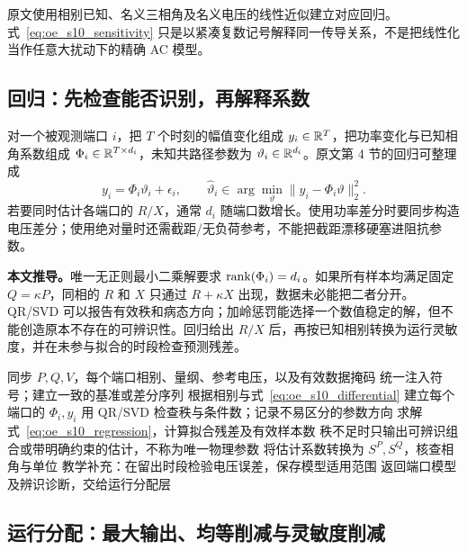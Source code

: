 原文使用相别已知、名义三相角及名义电压的线性近似建立对应回归。式~\eqref{eq:oe_s10_sensitivity} 只是以紧凑复数记号解释同一传导关系，不是把线性化当作任意大扰动下的精确 AC 模型。

\subsection{回归：先检查能否识别，再解释系数}

对一个被观测端口 $i$，把 $T$ 个时刻的幅值变化组成
$y_i\in\mathbb{R}^T$，把功率变化与已知相角系数组成
$\Phi_i\in\mathbb{R}^{T\times d_i}$，未知共路径参数为
$\vartheta_i\in\mathbb{R}^{d_i}$。原文第 4 节的回归可整理成
\begin{equation}
 y_i=\Phi_i\vartheta_i+\epsilon_i,\qquad
 \hat\vartheta_i\in\arg\min_\vartheta\|y_i-\Phi_i\vartheta\|_2^2.
 \label{eq:oe_s10_regression}
\end{equation}
若要同时估计各端口的 $R/X$，通常 $d_i$ 随端口数增长。使用功率差分时要同步构造电压差分；使用绝对量时还需截距/无负荷参考，不能把截距漂移硬塞进阻抗参数。

\textbf{本文推导。}唯一无正则最小二乘解要求
$\operatorname{rank}(\Phi_i)=d_i$。如果所有样本均满足固定 $Q=\kappa P$，同相的 $R$ 和 $X$ 只通过 $R+\kappa X$ 出现，数据未必能把二者分开。QR/SVD 可以报告有效秩和病态方向；加岭惩罚能选择一个数值稳定的解，但不能创造原本不存在的可辨识性。回归给出 $R/X$ 后，再按已知相别转换为运行灵敏度，并在未参与拟合的时段检查预测残差。

\begin{algorithm}[tbp]
\caption{S10 的辨识链：原模型顺序与教学数值诊断}
\label{alg:oe_s10_identify}
\begin{algorithmic}[1]
\Require 同步 $P,Q,V$，每个端口相别、量纲、参考电压，以及有效数据掩码
\State 统一注入符号；建立一致的基准或差分序列
\State 根据相别与式~\eqref{eq:oe_s10_differential} 建立每个端口的 $\Phi_i,y_i$
 \State 用 QR/SVD 检查秩与条件数；记录不易区分的参数方向
 \State 求解式~\eqref{eq:oe_s10_regression}，计算拟合残差及有效样本数
 \State 秩不足时只输出可辨识组合或带明确约束的估计，不称为唯一物理参数
\EndFor
\State 将估计系数转换为 $S^P,S^Q$，核查相角与单位
\State 教学补充：在留出时段检验电压误差，保存模型适用范围
\State 返回端口模型及辨识诊断，交给运行分配层
\end{algorithmic}
\end{algorithm}

\subsection{运行分配：最大输出、均等削减与灵敏度削减}

